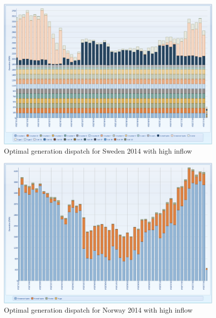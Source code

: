 \documentclass{article}
\begin{document}
\begin{figure}[htbp]
\begin{center}
\includegraphics[width=13cm,keepaspectratio=true]{figures/wetcase/MTgenerationSwet}
\caption{Optimal generation dispatch for Sweden 2014 with high inflow}
\label{fig:MTgenerationSwet}
\end{center}
\end{figure}
\begin{figure}[htbp]
\begin{center}
\includegraphics[width=13cm,keepaspectratio=true]{figures/wetcase/MTgenerationNwet}
\caption{Optimal generation dispatch for Norway 2014 with high inflow}
\label{fig:MTgenerationNwet}
\end{center}
\end{figure}
\end{document}
